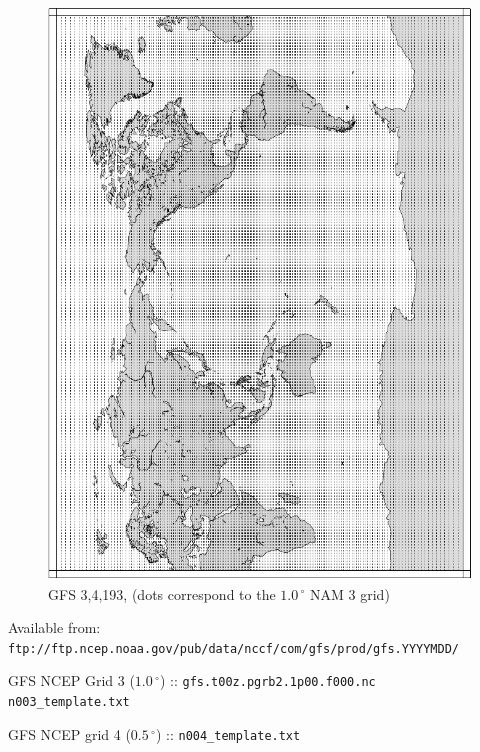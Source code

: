 \documentclass[11pt]{article}   %
\begin{document}
\begin{figure}[htbp]\begin{center}
 \includegraphics[angle=0,scale=0.95]{Figs/n003.pdf}
\parbox{15cm}{\caption{\label{FigNAM003}
GFS 3,4,193, (dots correspond to the $1.0 \, ^{\circ}$ NAM 3 grid)
}}
\end{center}\end{figure}
\clearpage

Available from:\\
\verb|ftp://ftp.ncep.noaa.gov/pub/data/nccf/com/gfs/prod/gfs.YYYYMDD/|

GFS NCEP Grid 3 ($1.0  \, ^{\circ}$) :: \verb|gfs.t00z.pgrb2.1p00.f000.nc|\\
\verb|n003_template.txt| \\
\tiny  \normalsize

GFS NCEP grid 4 ($0.5 \, ^{\circ}$) :: \verb|n004_template.txt| \\
\tiny  \normalsize
\end{document}
